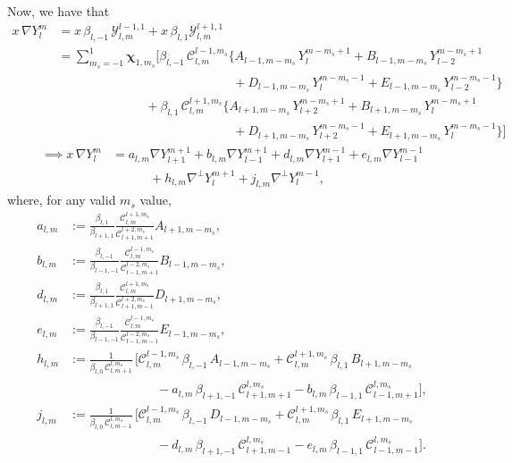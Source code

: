 \documentclass[11pt, oneside]{article}   	%
\newcommand{\gradY}{\nabla Y}
\newcommand{\gradYlm}{\nabla Y^m_l}
\newcommand{\gradpY}{\nabla^\perp Y}
\newcommand{\curlyy}{\bm{\mathcal{Y}}}
\newcommand{\blone}{\beta_{l, 1}}
\newcommand{\blzero}{\beta_{l, 0}}
\newcommand{\blmone}{\beta_{l, -1}}
\newcommand{\chivec}{\bm{\chi}_{1,m_s}}
\newcommand{\cgcoeff}{\mathcal{C}}
\newcommand{\alm}{a_{l,m}}
\newcommand{\blm}{b_{l,m}}
\newcommand{\dlm}{d_{l,m}}
\newcommand{\elm}{e_{l,m}}
\newcommand{\hlm}{h_{l,m}}
\newcommand{\jlm}{j_{l,m}}
\begin{document}
Now, we have that
\begin{align}
x \,\gradYlm 
&= x \, \blmone \, \curlyy^{l-1,1}_{l,m} + x \, \blone \curlyy^{l+1,1}_{l,m} \nonumber
\\
&= \sum_{m_s=-1}^{1} \chivec \Big[ \blmone \, \cgcoeff^{l-1,m_s}_{l,m} \big\{ A_{l-1,m-m_s} \, Y^{m-m_s+1}_{l} + B_{l-1,m-m_s} \, Y^{m-m_s+1}_{l-2} \nonumber \\ 
& \quad \quad \quad \quad \quad \quad \quad \quad \quad \quad \quad \quad \quad \quad + D_{l-1,m-m_s} \, Y^{m-m_s-1}_{l} + E_{l-1,m-m_s} \, Y^{m-m_s-1}_{l-2} \big\} \nonumber \\
& \quad \quad \quad \quad \quad \quad \quad + \blone \, \cgcoeff^{l+1,m_s}_{l,m} \big\{ A_{l+1,m-m_s} \, Y^{m-m_s+1}_{l+2} + B_{l+1,m-m_s} \, Y^{m-m_s+1}_{l} \nonumber \\ 
& \quad \quad \quad \quad \quad \quad \quad \quad \quad \quad \quad \quad \quad \quad + D_{l+1,m-m_s} \, Y^{m-m_s-1}_{l+2} + E_{l+1,m-m_s} \, Y^{m-m_s-1}_{l} \big\} \Big]
\end{align}
\begin{align}
\implies x \,\gradYlm &= \alm \gradY^{m+1}_{l+1} + \blm \gradY^{m+1}_{l-1} + \dlm \gradY^{m-1}_{l+1} + \elm \gradY^{m-1}_{l-1} \nonumber \\
& \quad \quad \quad + \hlm \gradpY^{m+1}_{l} + \jlm \gradpY^{m-1}_{l},
\end{align}
where, for any valid \(m_s\) value,
\begin{align}
\alm &:= \frac{\blone}{\beta_{l+1,1}} \frac{\cgcoeff^{l+1,m_s}_{l,m}}{\cgcoeff^{l+2,m_s}_{l+1,m+1}} A_{l+1,m-m_s}, \\
\blm &:= \frac{\blmone}{\beta_{l-1,-1}} \frac{\cgcoeff^{l-1,m_s}_{l,m}}{\cgcoeff^{l-2,m_s}_{l-1,m+1}} B_{l-1,m-m_s}, \\
\dlm &:= \frac{\blone}{\beta_{l+1,1}} \frac{\cgcoeff^{l+1,m_s}_{l,m}}{\cgcoeff^{l+2,m_s}_{l+1,m-1}} D_{l+1,m-m_s}, \\
\elm &:= \frac{\blmone}{\beta_{l-1,-1}} \frac{\cgcoeff^{l-1,m_s}_{l,m}}{\cgcoeff^{l-2,m_s}_{l-1,m-1}} E_{l-1,m-m_s}, \\
\hlm &:= \frac{1}{\blzero \, \cgcoeff^{l,m_s}_{l, m+1}} \, \Big[ \cgcoeff^{l-1,m_s}_{l,m} \, \blmone \, A_{l-1,m-m_s} + \cgcoeff^{l+1,m_s}_{l,m} \, \blone \, B_{l+1,m-m_s} \nonumber \\
& \quad \quad \quad \quad \quad \quad \quad - \alm \, \beta_{l+1,-1} \, \cgcoeff^{l,m_s}_{l+1,m+1} - \blm \, \beta_{l-1,1} \, \cgcoeff^{l,m_s}_{l-1,m+1} \Big], \\
\jlm &:= \frac{1}{\blzero \, \cgcoeff^{l,m_s}_{l, m-1}} \, \Big[ \cgcoeff^{l-1,m_s}_{l,m} \, \blmone \, D_{l-1,m-m_s} + \cgcoeff^{l+1,m_s}_{l,m} \, \blone \, E_{l+1,m-m_s} \nonumber \\
& \quad \quad \quad \quad \quad \quad \quad - \dlm \, \beta_{l+1,-1} \, \cgcoeff^{l,m_s}_{l+1,m-1} - \elm \, \beta_{l-1,1} \, \cgcoeff^{l,m_s}_{l-1,m-1} \Big].
\end{align}
\end{document}
